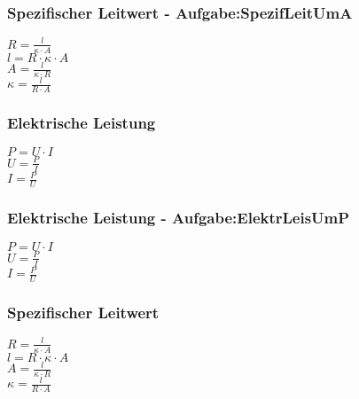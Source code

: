 \subsubsection{Spezifischer Leitwert - Aufgabe:SpezifLeitUmA} 
\begin{minipage}{0.45\textwidth} 
$ R = \frac{ l}{\kappa \cdot A} $\\ 
$ l = R\cdot \kappa \cdot A $\\ 
$ A = \frac{l}{\kappa \cdot R} $\\ 
$ \kappa  = \frac{ l}{R\cdot A} $\\ 
\end{minipage} 
\begin{minipage}{0.45\textwidth} 
 
\end{minipage} 
\subsubsection{Elektrische Leistung} 
\begin{minipage}{0.45\textwidth} 
$ P = U\cdot I $\\ 
$ U = \frac{P}{I} $\\ 
$ I = \frac{P}{U} $\\ 
\end{minipage} 
\begin{minipage}{0.45\textwidth} 
 
\end{minipage} 
\subsubsection{Elektrische Leistung - Aufgabe:ElektrLeisUmP} 
\begin{minipage}{0.45\textwidth} 
$ P = U\cdot I $\\ 
$ U = \frac{P}{I} $\\ 
$ I = \frac{P}{U} $\\ 
\end{minipage} 
\begin{minipage}{0.45\textwidth} 
 
\end{minipage} 
\subsubsection{Spezifischer Leitwert} 
\begin{minipage}{0.45\textwidth} 
$ R = \frac{ l}{\kappa \cdot A} $\\ 
$ l = R\cdot \kappa \cdot A $\\ 
$ A = \frac{l}{\kappa \cdot R} $\\ 
$ \kappa  = \frac{ l}{R\cdot A} $\\ 
\end{minipage} 
\begin{minipage}{0.45\textwidth} 
 
\end{minipage} 
